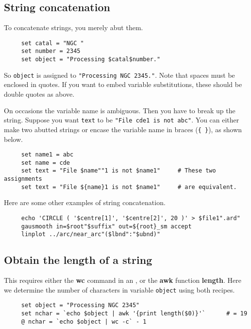 \subsection{String concatenation
\label{sc4_se_string_conc}}

To concatenate strings, you merely abut them.

\small
\begin{verbatim}
     set catal = "NGC "
     set number = 2345
     set object = "Processing $catal$number."
\end{verbatim}
\normalsize
So {\tt object} is assigned to {\tt "Processing NGC 2345."}.
Note that spaces must be enclosed in quotes.  If you want to embed
variable substitutions, these should be double quotes as above.

On occasions the variable name is ambiguous.  Then you have to break up
the string.  Suppose you want {\tt text} to be {\tt "File cde1 is not
abc"}.  You can either make two abutted strings or encase the variable
name in braces (\verb+{+~\verb+}+), as shown below.

\small
\begin{verbatim}
     set name1 = abc
     set name = cde
     set text = "File $name""1 is not $name1"     # These two assignments
     set text = "File ${name}1 is not $name1"     # are equivalent.
\end{verbatim}
\normalsize

Here are some other examples of string concatenation.

\small
\begin{verbatim}
     echo 'CIRCLE ( '$centre[1]', '$centre[2]', 20 )' > $file1".ard"
     gausmooth in=$root"$suffix" out=${root}_sm accept
     linplot ../arc/near_arc"($lbnd":"$ubnd)"
\end{verbatim}
\normalsize

\newpage
\subsection{Obtain the length of a string
\label{sc4_se_string_length}}

This requires either the {\bf wc} command in an
, or the {\bf awk} function {\bf length}.
Here we determine the number of characters
in variable {\tt object} using both recipes.

\small
\begin{verbatim}
     set object = "Processing NGC 2345"
     set nchar = `echo $object | awk '{print length($0)}'`      # = 19
     @ nchar = `echo $object | wc -c` - 1
\end{verbatim}
\normalsize

